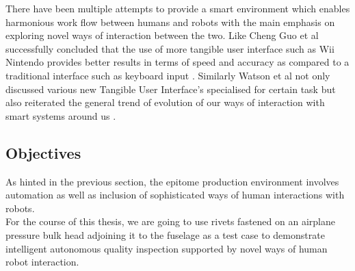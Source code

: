 \documentclass{article}
\begin{document}
There have been multiple attempts to provide a smart environment which enables harmonious work flow between humans and robots with the main emphasis on exploring novel ways of interaction between the two. Like Cheng Guo et al successfully concluded that the use of more tangible user interface such as Wii Nintendo provides better results in terms of speed and accuracy as compared to a traditional interface such as keyboard input \cite{Guo:2008:EUT:1357054.1357076}. Similarly Watson et al not only discussed various new Tangible User Interface's specialised for certain task but also reiterated the general trend of evolution of our ways of interaction with smart systems around us \cite{Sharlin:2004:TUI:1023813.1023818}.

\subsection{Objectives}

As hinted in the previous section, the epitome production environment involves automation as well as inclusion of sophisticated ways of human interactions with robots.\\

For the course of this thesis, we are going to use rivets fastened on an airplane pressure bulk head adjoining it to the fuselage as a test case to demonstrate intelligent autonomous quality inspection supported by novel ways of human robot interaction.\\
\end{document}
